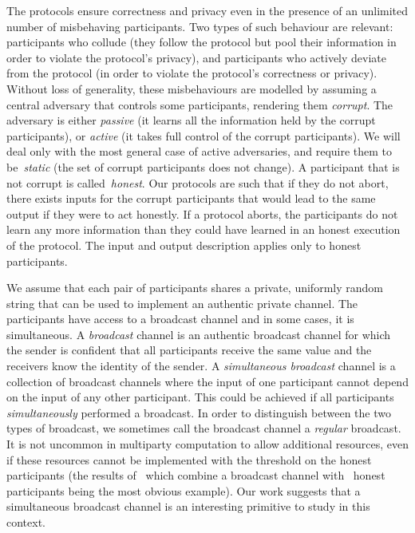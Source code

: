 \documentclass[11pt]{article}
\begin{document}
The protocols ensure correctness and privacy even in the presence of
an unlimited number of misbehaving participants. Two types of such
behaviour are relevant: participants who collude (they follow the
protocol but pool their information in order to violate the
protocol's privacy), and participants who actively deviate from the
protocol (in order to violate the protocol's correctness or
privacy). Without loss of generality, these misbehaviours are
modelled by assuming a central adversary that controls  some
participants, rendering them \emph{corrupt}. The adversary is either
\emph{passive} (it learns all the information held by the corrupt
participants), or \emph{active} (it takes full control of the
corrupt participants). We will deal only with the most general case
of active adversaries, and require them to be~\emph{static} (the set
of corrupt participants does not change). A participant that is not
corrupt is called~\emph{honest}. Our protocols are such that if they
do not abort, there exists inputs for the corrupt participants that
would  lead to the same output if they were to act honestly. If a
protocol aborts, the participants do not learn any more information
than they could have learned in an honest execution of the protocol.
The input and output description applies  only to honest
participants.

We assume that each pair of participants shares a
private, uniformly random string that can be used to implement an
authentic private channel. The participants have access to a
broadcast channel and in some cases, it is simultaneous. A
\emph{broadcast} channel is an authentic broadcast channel for which
the sender is confident that all participants receive the same value
and the receivers know the identity of the sender. A
\emph{simultaneous broadcast} channel is a collection of broadcast
channels where the input of one participant cannot depend on the
input of any other participant. This could be achieved if all
participants {\em simultaneously} performed a broadcast. In order to
distinguish between the two types of broadcast, we sometimes call
the broadcast channel a \emph{regular} broadcast.
It is not
uncommon in multiparty computation to allow additional resources,
even if these resources cannot be implemented with the threshold on
the honest participants (the results of~\cite{RB89} which combine a
broadcast channel with~ honest participants being the most
obvious example). Our work suggests that a simultaneous broadcast
channel is an interesting primitive to study in this context.
\end{document}
